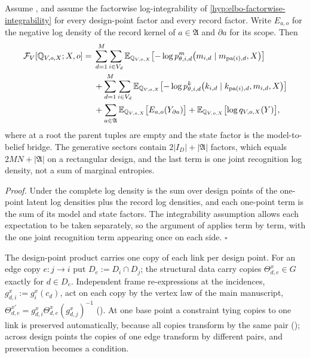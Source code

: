 Assume , and assume the factorwise log-integrability of
\cref{hyp:elbo-factorwise-integrability} for every design-point factor and every record factor.
Write \(E_{a,o}\) for the negative log density of the record kernel of \(a\in\mathfrak A\) and
\(\partial a\) for its scope. Then
\begin{align*}
\mathcal F_V[\mathbb Q_{V,o,X};X,o]
={}&\sum_{d=1}^{M}\sum_{i\in V_d}
\mathbb E_{\mathbb Q_{V,o,X}}\bigl[
-\log p_{\theta,i,d}^{m}\bigl(m_{i,d}\mid m_{\operatorname{pa}(i),d},X\bigr)\bigr]\\
&+\sum_{d=1}^{M}\sum_{i\in V_d}
\mathbb E_{\mathbb Q_{V,o,X}}\bigl[
-\log p_{\theta,i,d}^{k}\bigl(k_{i,d}\mid k_{\operatorname{pa}(i),d},m_{i,d},X\bigr)\bigr]\\
&+\sum_{a\in\mathfrak A}\mathbb E_{\mathbb Q_{V,o,X}}\bigl[E_{a,o}(Y_{\partial a})\bigr]
+\mathbb E_{\mathbb Q_{V,o,X}}\bigl[\log q_{V,o,X}(Y)\bigr],
\end{align*}
where at a root the parent tuples are empty and the state factor is the model-to-belief bridge. The
generative sectors contain \(2|I_D|+|\mathfrak A|\) factors, which equals \(2MN+|\mathfrak A|\) on a
rectangular design, and the last term is one joint recognition log density, not a sum of marginal
entropies. 

\noindent\emph{Proof.}
Under  the complete log density is the sum over design points of the
one-point latent log densities plus the record log densities, and each one-point term is the sum of
its model and state factors. The integrability assumption allows each expectation to be taken
separately, so the argument of  applies term by term, with
the one joint recognition term appearing once on each side. \hfill$\square$

The design-point product carries one copy of each link per design point. For an edge copy
\(e:j\to i\) put \(D_e:=D_i\cap D_j\); the structural data carry copies \(\Theta_{d,e}^x\in G\)
exactly for \(d\in D_e\). Independent frame re-expressions at the incidences,
\(g_{d,i}^x:=g_i^x(c_d)\), act on each copy by the vertex law of the main manuscript,
\(\Theta_{d,e}^{x\prime}=g_{d,i}^x\Theta_{d,e}^x(g_{d,j}^x)^{-1}\) (). At one
base point a constraint tying copies to one link is preserved automatically, because all copies
transform by the same pair (); across design points the copies of
one edge transform by different pairs, and preservation becomes a condition.

